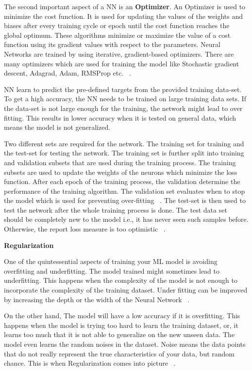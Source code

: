 The second important aspect of a NN is an \textbf{Optimizer}. An Optimizer is used to minimize the cost function. It is used for updating the values of the weights and biases after every training cycle or epoch until the cost function reaches the global optimum. These algorithms minimize or maximize the value of a cost function using its gradient values with respect to the parameters. Neural Networks are trained by using iterative, gradient-based optimizers. There are many optimizers which are used for training the model like Stochastic gradient descent, Adagrad, Adam, RMSProp etc.  ~\cite{Goodfellow-et-al-2016}. 

NN learn to predict the pre-defined targets from the provided training data-set. To get a high accuracy, the NN needs to be trained on large training data sets. If the data-set is not large enough for the training, the network might lead to over fitting.
This results in lower accuracy when it is tested on general data, which means the model is not generalized.

Two different sets are required for the network. The training set for training and the test-set for testing the network. The training set is further split into training and validation subsets that are used during the training process. The training subsets are used to update the weights of the neurons which minimize the loss function. After each epoch of the training process, the validation determine the performance of the training algorithm. The validation
set evaluates when to stop the model which is used for preventing over-fitting  ~\cite{Goodfellow-et-al-2016}. 
The test-set is then used to test the network after the whole training process is done. The test data set should be completely new to the model i.e., it has never seen such samples before. Otherwise, the report loss measure is too optimistic  ~\cite{Goodfellow-et-al-2016}.
\newline

\noindent\textbf{Regularization}
\newline

\noindent One of the quintessential aspects of training your ML model is avoiding overfitting and underfitting. The model trained might sometimes lead to underfitting. This happens when the complexity of the model is not enough to incorporate the complexity of the training dataset. Under fitting can be improved by increasing the depth or the width of the Neural Network ~\cite{Goodfellow-et-al-2016}.

On the other hand, The model will have a low accuracy if it is overfitting. This happens when the model is trying too hard to learn the training dataset, or, it learns too much that it is not able to generalize on the new unseen data. The model even learns the random noises in the dataset. Noise means the data points that do not really represent the true characteristics of your data, but random chance. This is when Regularization comes into picture ~\cite{Goodfellow-et-al-2016}.  

